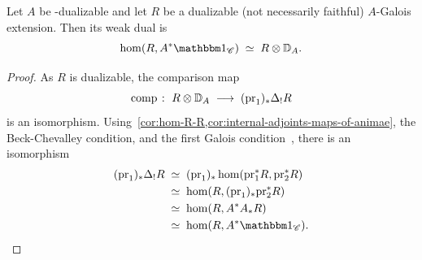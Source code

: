 \documentclass[english,svgnames,table]{article}
\begin{document}
    \begin{proposition}
    \label{prop:dual-of-Galois}
        Let $A$ be \COB-dualizable and let $R$ be a dualizable (not necessarily faithful) $A$-Galois extension. Then its weak dual is
        \begin{equation*}
            \hom(R, A^* \ounit_{\cC}) \;\simeq\; R \otimes \DD_A.
        \end{equation*}
    \end{proposition}
    \begin{proof}
        As $R$ is dualizable, the comparison map
        \begin{equation*}
            \mathrm{comp} \;\colon\; R \otimes \mathbb{D}_A \;\longrightarrow\; (\mathrm{pr}_1)_*\Delta_! R
        \end{equation*}
        is an isomorphism. Using~\cref{cor:hom-R-R,cor:internal-adjoints-maps-of-animae}, the Beck-Chevalley condition, and the first Galois condition~, there is an isomorphism
        \begin{equation*}
            \begin{split}
                (\pr_1)_* \Delta_! R
                & \;\simeq\; (\pr_1)_* \hom(\pr_1^* R, \pr_2^* R) \\
                & \;\simeq\; \hom(R, (\pr_1)_* \pr_2^* R) \\
                & \;\simeq\; \hom(R, A^* A_* R) \\
                & \;\simeq\; \hom(R, A^* \ounit_{\cC}).
            \end{split}
        \end{equation*}
    \end{proof}
\end{document}
